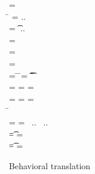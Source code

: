\documentclass[runnningheads]{tex/llncs}
\begin{document}
\begin{figure}[!b]
	
	\hrulefill
	
	\medskip
	
	\small
	\begin{minipage}{12cm}  
		\begin{tabbing}
			 =  \\
			\hspace{4.6cm}\= \WHERE\HS 
			\mdp[1] = \src{\Mdef\m\x\t\tp{\ep[1]}} ..\HS\HS \\
			\>\qquad\HS\HS\HS\HS\md[1] = \Mdef\m\x\t\tp{\e[1]} ..\HS\HS \\
			\>\qquad\HS\HS\HS\HS \ep[1] = \TRG{\e[1]}{\x:\t\,\this:\C}
			\\
			\TRG\x\Env = \src{\x}
			\\
			\TRG{\FRead\f}\Env  = \src{\FRead\f}
			\\
			\TRG{\FWrite\f\e}\Env =  \src{\FWrite\f\ep} 
			\>\WHERE\HS
			\= \TypeCk\K{\this}\C \HS\HS
			\=  \ep = \TAG\e\Env\t \HS\HS
			\= \Ftype\f\t\In\App\K\C
			\\
			\TRG{\Call{\e[1]}\m{\e[2]}}\Env = \src{\DynCall{\ep[1]}\m{\ep[2]}}
			\>\WHERE \> \TypeCk{\K,\Env}{\e[1]}\any \HS
			\> \ep[1] = \TRG{\e[1]}\Env \HS
			\> \ep[2] = \TAG{\e[2]}\Env\any
			\\
			\TRG{\Call{\e[1]}\m{\e[2]}}\Env = \src{\KCall{\ep[1]}\m{\ep[2]}{\D[1]}{\D[2]}}
			\>\WHERE \> \TypeCk{\K,\Env}{\e[1]}\C 
			\> \ep[1] = \TRG{\e[1]}\Env\HS\HS
			\> \ep[2] = \TAG{\e[2]}\Env{\D[1]} \HS\HS \\
			\> \> \=  \Mtype\m{\D[1]}{\D[2]}\In\App\K\C 
			\\
			\Env =  
			\>\WHERE \>  \ep[1] = \TAG{\e[1]}\Env{\t[1]} ~..
			\> \HS\HS\HS\HS\HS\HS\HS\HS\HS\HS \Ftype{\f[1]}{\t[1]}\In\App\K\C ~..
			\\
			\TAG\e\Env\t = \src\ep
			\> \WHERE\> \TypeCk{\K,\Env}\e\tp \HS
			\>\HS\HS\HS\HS\HS\HS\HS\HS\HS\HS \EM{\K\vdash \t \Sub \tp}
			\>\ep = \TRG\e\Env
			\\
			\TAG\e\Env\t = \src{\BehCast\t\e}
			\>\WHERE\> \TypeCk{\K,\Env}\e\tp \HS 
			\>\HS\HS\HS\HS\HS\HS\HS\HS\HS\HS  \EM{\K\vdash \t \not \Sub \tp}
			\> \ep = \TRG\e\Env
		\end{tabbing}
	\end{minipage}
	
	\medskip
	
	\hrulefill
	\caption{Behavioral translation}\label{trtr2}
\end{figure}
\end{document}
